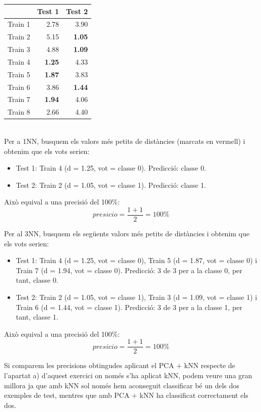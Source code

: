 \documentclass{article} %
\begin{document}
{	{\selectfont\small
	\begin{tabular}{r | r r}
		 & Test 1 & Test 2 \\\hline
		Train 1 & 2.78 & 3.90 \\
		Train 2 & 5.15 & {\color{red} \textbf{1.05}} \\
		Train 3 & 4.88 & {\color{olive} \textbf{1.09}} \\
		Train 4 & {\color{red} \textbf{1.25}} & 4.33 \\
		Train 5 & {\color{olive} \textbf{1.87}} & 3.83 \\
		Train 6 & 3.86 & {\color{olive} \textbf{1.44}} \\
		Train 7 & {\color{olive} \textbf{1.94}} & 4.06 \\
		Train 8 & 2.66 & 4.40 \\
	\end{tabular}
	} \\

	Per a 1NN, busquem els valors més petits de distàncies (marcats en vermell) i obtenim que els vots serien:

	\begin{itemize}
		\item Test 1: Train 4 (d = 1.25, vot = classe 0). Predicció: classe 0.
		\item Test 2: Train 2 (d = 1.05, vot = classe 1). Predicció: classe 1.
	\end{itemize}

	Això equival a una precisió del 100\%:
	\[presicio = \frac{1 + 1}{2} = 100\%\]

	
	Per al 3NN, busquem els següents valors més petits de distàncies i obtenim que els vots serien:

	\begin{itemize}
		\item Test 1: Train 4 (d = 1.25, vot = classe 0), Train 5 (d = 1.87, vot = classe 0) i Train 7 (d = 1.94, vot = classe 0). Predicció: 3 de 3 per a la classe 0, per tant, classe 0.
		\item Test 2: Train 2 (d = 1.05, vot = classe 1), Train 3 (d = 1.09, vot = classe 1) i Train 6 (d = 1.44, vot = classe 1). Predicció: 3 de 3 per a la classe 1, per tant, classe 1.
	\end{itemize}

	Això equival a una precisió del 100\%:
	\[presicio = \frac{1 + 1}{2} = 100\%\]

	Si comparem les precisions obtingudes aplicant el PCA + kNN respecte de l'apartat a) d'aquest exercici on només s'ha aplicat kNN, podem veure una gran millora ja que amb kNN sol només hem aconseguit classificar bé un dels dos exemples de test, mentres que amb PCA + kNN ha classificat correctament els dos. \\

}
\end{document}
